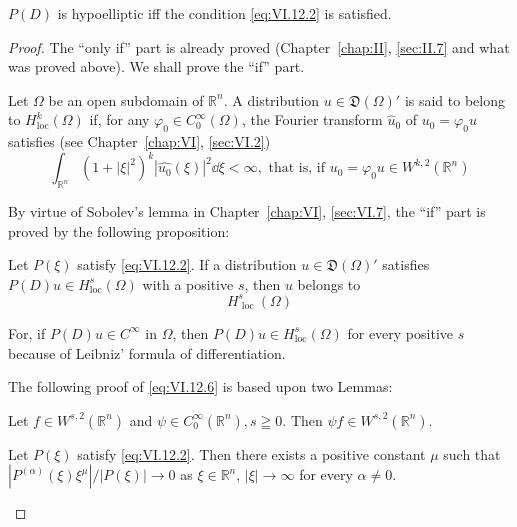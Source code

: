 \begin{theoremn} $P(D)$ is hypoelliptic iff the condition \eqref{eq:VI.12.2} is satisfied.

\end{theoremn}
\begin{proof}
 The ``only if'' part is already proved (Chapter~\ref{chap:II}, \ref{sec:II.7} and what was proved above). We shall prove the ``if'' part. 

Let $\Omega$ be an open subdomain of $\mathbb{R}^{n}$. A distribution $u \in \mathfrak{D}(\Omega)'$ is said to belong to $H_{\mathrm{loc}}^k(\Omega)$ if, for any $\varphi_0 \in C_0^\infty(\Omega)$, the Fourier transform $\hat{u}_0$ of $u_0 = \varphi_0 u$ satisfies (see Chapter~\ref{chap:VI}, \ref{sec:VI.2}) 
\begin{equation}\label{eq:VI.12.5}
\int_ {\mathbb{R}^{n}} (1 + | \xi | ^{2}) ^{k} | \hat {u _{0}} (\xi) | ^{2} \dd \xi < \infty , \text{ that is, if } u _{0} = \varphi_{0} u \in W ^{k,2} (\mathbb{R}^{n})
\end{equation}

By virtue of Sobolev's lemma in Chapter~\ref{chap:VI}, \ref{sec:VI.7}, the ``if'' part is proved by the following proposition: 

Let $P(\xi)$ satisfy \eqref{eq:VI.12.2}. If a distribution $u \in \mathfrak{D}(\Omega)'$ satisfies 
$P(D) u \in H_{\mathrm{loc}}^{s}(\Omega)$ with a positive $s$, then $u$ belongs to 
\begin{equation}\label{eq:VI.12.6}
H _ {\text{ loc }} ^{s} (\Omega)
\end{equation}

For, if $P(D) u \in C^{\infty}$ in $\Omega$, then $P(D) u \in H_{\mathrm{loc}}^{s}(\Omega)$ for every positive $s$ because of Leibniz' formula of differentiation. 

The following proof of \eqref{eq:VI.12.6} is based upon two Lemmas: 

\begin{lemma}\label{lem:VI.12.Lemma.1} Let $f \in W^{s,2}(\mathbb{R}^{n})$ and $\psi \in C_0^\infty(\mathbb{R}^{n}), s \geqq 0$. Then $\psi f \in W^{s,2}(\mathbb{R}^{n})$. 
\end{lemma}

\begin{lemma}\label{lem:VI.12.Lemma.2} Let $P(\xi)$ satisfy \eqref{eq:VI.12.2}. Then there exists a positive constant $\mu$ such that $|P^{(\alpha)}(\xi)\xi^{\mu}| / |P(\xi)|\to 0$ as $\xi \in \mathbb{R}^{n}$, $|\xi |\to \infty$ for every $\alpha \neq 0$. 
\end{lemma}


\end{proof}
